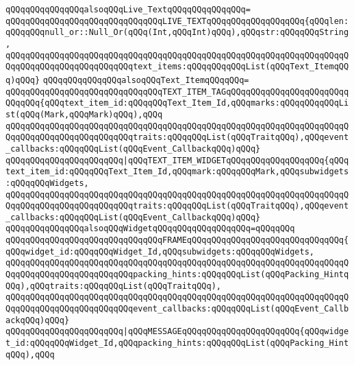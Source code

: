 \verb|qQQqqQQqqQQqqQQqalsoqQQqLive_TextqQQqqQQqqQQqqQQq=|\newline
\verb|qQQqqQQqqQQqqQQqqQQqqQQqqQQqqQQqLIVE_TEXTqQQqqQQqqQQqqQQqqQQq{qQQqlen:qQQqqQQqnull_or::Null_Or(qQQq(Int,qQQqInt)qQQq),qQQqstr:qQQqqQQqString,|\newline
\verb|qQQqqQQqqQQqqQQqqQQqqQQqqQQqqQQqqQQqqQQqqQQqqQQqqQQqqQQqqQQqqQQqqQQqqQQqqQQqqQQqqQQqqQQqqQQqqQQqtext_items:qQQqqQQqqQQqList(qQQqText_ItemqQQq)qQQq}|\newline
\newline
\verb|qQQqqQQqqQQqqQQqalsoqQQqText_ItemqQQqqQQq=|\newline
\verb|qQQqqQQqqQQqqQQqqQQqqQQqqQQqqQQqTEXT_ITEM_TAGqQQqqQQqqQQqqQQqqQQqqQQqqQQqqQQq{qQQqtext_item_id:qQQqqQQqText_Item_Id,qQQqmarks:qQQqqQQqqQQqList(qQQq(Mark,qQQqMark)qQQq),qQQq|\newline
\verb|qQQqqQQqqQQqqQQqqQQqqQQqqQQqqQQqqQQqqQQqqQQqqQQqqQQqqQQqqQQqqQQqqQQqqQQqqQQqqQQqqQQqqQQqqQQqqQQqtraits:qQQqqQQqList(qQQqTraitqQQq),qQQqevent_callbacks:qQQqqQQqList(qQQqEvent_CallbackqQQq)qQQq}|\newline
\verb|qQQqqQQqqQQqqQQqqQQqqQQq|\verb#|qQQqTEXT_ITEM_WIDGETqQQqqQQqqQQqqQQqqQQq{qQQqtext_item_id:qQQqqQQqText_Item_Id,qQQqmark:qQQqqQQqMark,qQQqsubwidgets:qQQqqQQqWidgets,#\newline
\verb|qQQqqQQqqQQqqQQqqQQqqQQqqQQqqQQqqQQqqQQqqQQqqQQqqQQqqQQqqQQqqQQqqQQqqQQqqQQqqQQqqQQqqQQqqQQqqQQqtraits:qQQqqQQqList(qQQqTraitqQQq),qQQqevent_callbacks:qQQqqQQqList(qQQqEvent_CallbackqQQq)qQQq}|\newline
\newline
\verb|qQQqqQQqqQQqqQQqalsoqQQqWidgetqQQqqQQqqQQqqQQqqQQq=qQQqqQQq|\newline
\verb|qQQqqQQqqQQqqQQqqQQqqQQqqQQqqQQqFRAMEqQQqqQQqqQQqqQQqqQQqqQQqqQQqqQQq{qQQqwidget_id:qQQqqQQqWidget_Id,qQQqsubwidgets:qQQqqQQqWidgets,|\newline
\verb|qQQqqQQqqQQqqQQqqQQqqQQqqQQqqQQqqQQqqQQqqQQqqQQqqQQqqQQqqQQqqQQqqQQqqQQqqQQqqQQqqQQqqQQqqQQqqQQqpacking_hints:qQQqqQQqList(qQQqPacking_HintqQQq),qQQqtraits:qQQqqQQqList(qQQqTraitqQQq),|\newline
\verb|qQQqqQQqqQQqqQQqqQQqqQQqqQQqqQQqqQQqqQQqqQQqqQQqqQQqqQQqqQQqqQQqqQQqqQQqqQQqqQQqqQQqqQQqqQQqqQQqevent_callbacks:qQQqqQQqList(qQQqEvent_CallbackqQQq)qQQq}|\newline
\verb|qQQqqQQqqQQqqQQqqQQqqQQq|\verb#|qQQqMESSAGEqQQqqQQqqQQqqQQqqQQqqQQq{qQQqwidget_id:qQQqqQQqWidget_Id,qQQqpacking_hints:qQQqqQQqList(qQQqPacking_HintqQQq),qQQq#\newline
